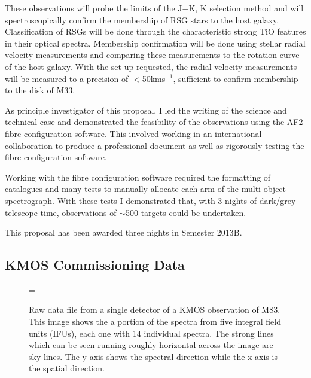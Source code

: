 \documentclass[a4paper,12pt]{article}
\begin{document}
These observations will probe the limits of the J$-$K, K selection method and will spectroscopically confirm the membership of RSG stars to the host galaxy. 
Classification of RSGs will be done through the characteristic strong TiO features in their optical spectra.
Membership confirmation will be done using stellar radial velocity measurements and comparing these measurements to the rotation curve of the host galaxy. 
With the set-up requested, the radial velocity measurements will be measured to a precision of $<$50kms$^{-1}$, sufficient to confirm membership to the disk of M33.

As principle investigator of this proposal, I led the writing of the science and technical case and demonstrated the feasibility of the observations using the AF2 fibre configuration software.
This involved working in an international collaboration to produce a professional document as well as rigorously testing the fibre configuration software. 

Working with the fibre configuration software required the formatting of catalogues and many tests to manually allocate each arm of the multi-object spectrograph. 
With these tests I demonstrated that, with 3 nights of dark/grey telescope time, observations of $\sim$500 targets could be undertaken.

This proposal has been awarded three nights in Semester 2013B. 

\subsection{KMOS Commissioning Data}\label{reduction}

\begin{figure}     %
        \begin{center}
          \epsfxsize=\linewidth         %
\end{center}
\caption{Raw data file from a single detector of a KMOS observation of M83. 
This image shows the a portion of the spectra from five integral field units (IFUs), each one with 14 individual spectra.
The strong lines which can be seen running roughly horizontal across the image are sky lines.
The y-axis shows the spectral direction while the x-axis is the spatial direction.}
\label{KMOSdata}                 %
\end{figure}
\end{document}
